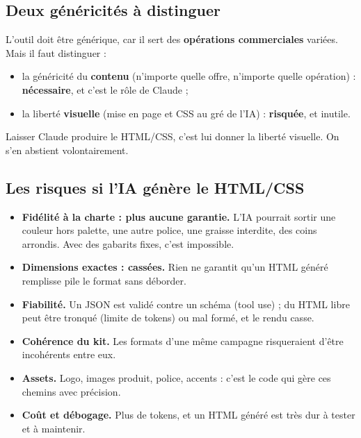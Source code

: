 \documentclass[11pt,a4paper]{article}
\begin{document}
\subsection{Deux généricités à distinguer}
L'outil doit être générique, car il sert des \textbf{opérations commerciales}
variées. Mais il faut distinguer :
\begin{itemize}[leftmargin=1.4em]
  \item la généricité du \textbf{contenu} (n'importe quelle offre, n'importe quelle
        opération) : \textbf{nécessaire}, et c'est le rôle de Claude ;
  \item la liberté \textbf{visuelle} (mise en page et CSS au gré de l'IA) :
        \textbf{risquée}, et inutile.
\end{itemize}
Laisser Claude produire le HTML/CSS, c'est lui donner la liberté visuelle. On s'en
abstient volontairement.

\subsection{Les risques si l'IA génère le HTML/CSS}
\begin{itemize}[leftmargin=1.4em]
  \item \textbf{Fidélité à la charte : plus aucune garantie.} L'IA pourrait sortir
        une couleur hors palette, une autre police, une graisse interdite, des
        coins arrondis. Avec des gabarits fixes, c'est impossible.
  \item \textbf{Dimensions exactes : cassées.} Rien ne garantit qu'un HTML généré
        remplisse pile le format sans déborder.
  \item \textbf{Fiabilité.} Un JSON est validé contre un schéma (tool use) ; du
        HTML libre peut être tronqué (limite de tokens) ou mal formé, et le rendu
        casse.
  \item \textbf{Cohérence du kit.} Les formats d'une même campagne risqueraient
        d'être incohérents entre eux.
  \item \textbf{Assets.} Logo, images produit, police, accents : c'est le code qui
        gère ces chemins avec précision.
  \item \textbf{Coût et débogage.} Plus de tokens, et un HTML généré est très dur à
        tester et à maintenir.
\end{itemize}
\end{document}
